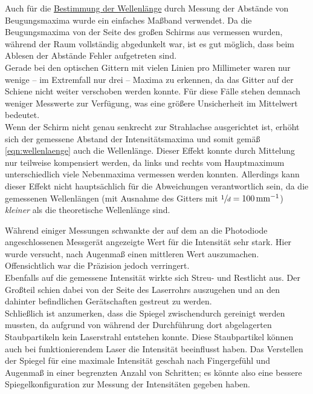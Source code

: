     Auch für die \hyperref[sec:auswertung:wellenlaenge]{Bestimmung der Wellenlänge}
    durch Messung der Abstände von Beugungsmaxima
    wurde ein einfaches Maßband verwendet.
    Da die Beugungsmaxima von der Seite des großen Schirms aus vermessen wurden,
    während der Raum vollständig abgedunkelt war,
    ist es gut möglich,
    dass beim Ablesen der Abstände Fehler aufgetreten sind.\\
    Gerade bei den optischen Gittern mit vielen Linien pro Millimeter waren nur wenige
    – im Extremfall nur drei –
    Maxima zu erkennen,
    da das Gitter auf der Schiene nicht weiter verschoben werden konnte.
    Für diese Fälle stehen demnach weniger Messwerte zur Verfügung,
    was eine größere Unsicherheit im Mittelwert bedeutet.\\
    Wenn der Schirm nicht genau senkrecht zur Strahlachse ausgerichtet ist,
    erhöht sich der gemessene Abstand der Intensitätsmaxima und somit gemäß \autoref{eqn:wellenlaenge} auch die Wellenlänge.
    Dieser Effekt konnte durch Mittelung nur teilweise kompensiert werden,
    da links und rechts vom Hauptmaximum unterschiedlich viele Nebenmaxima vermessen werden konnten.
    Allerdings kann dieser Effekt nicht hauptsächlich für die Abweichungen verantwortlich sein,
    da die gemessenen Wellenlängen
    (mit Ausnahme des Gitters mit $\sfrac{1}{d} = \SI[per-mode=reciprocal]{100}{\per\milli\meter}$)
    \textit{kleiner} als die theoretische Wellenlänge sind.


    Während einiger Messungen schwankte der
    auf dem an die Photodiode angeschlossenen Messgerät angezeigte
    Wert für die Intensität sehr stark.
    Hier wurde versucht, nach Augenmaß einen mittleren Wert auszumachen.
    Offensichtlich war die Präzision jedoch verringert.\\
    Ebenfalls auf die gemessene Intensität wirkte sich Streu- und Restlicht aus.
    Der Großteil schien dabei von der Seite des Laserrohrs auszugehen und an den dahinter befindlichen Gerätschaften gestreut zu werden.\\
    Schließlich ist anzumerken,
    dass die Spiegel zwischendurch gereinigt werden mussten,
    da aufgrund von während der Durchführung dort abgelagerten Staubpartikeln kein Laserstrahl entstehen konnte.
    Diese Staubpartikel können auch bei funktionierendem Laser die Intensität beeinflusst haben.
    Das Verstellen der Spiegel für eine maximale Intensität geschah nach Fingergefühl und Augenmaß
    in einer begrenzten Anzahl von Schritten;
    es könnte also eine bessere Spiegelkonfiguration zur Messung der Intensitäten gegeben haben.
